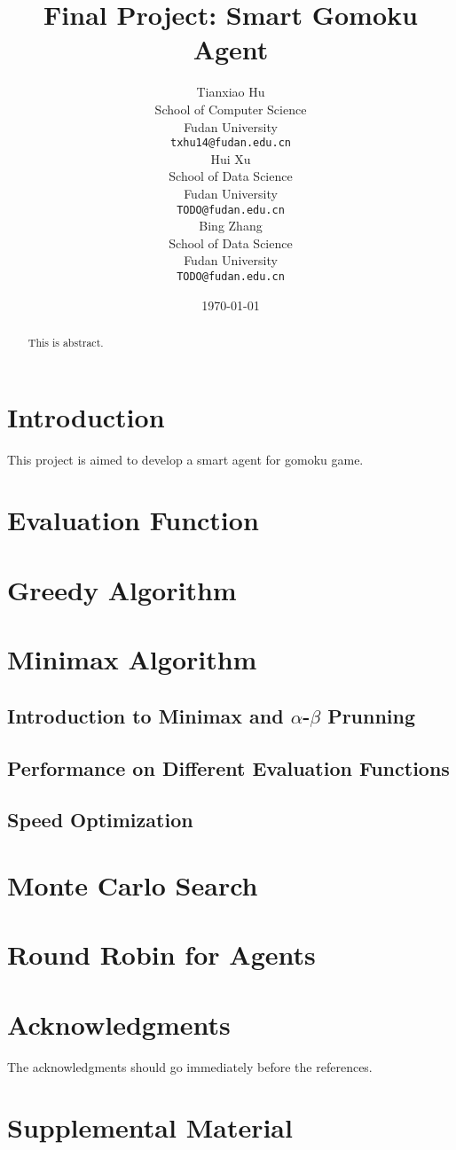 \documentclass[11pt,a4paper]{article}
\title{Final Project: Smart Gomoku Agent}
\author{Tianxiao Hu \\
  School of Computer Science\\
  Fudan University\\
  {\tt txhu14@fudan.edu.cn} \\\And
  Hui Xu \\
  School of Data Science\\
  Fudan University\\
  {\tt TODO@fudan.edu.cn} \\\And
  Bing Zhang \\
  School of Data Science\\
  Fudan University\\
  {\tt TODO@fudan.edu.cn}
}
\date{\today}
\begin{document}
\maketitle
\begin{abstract}
  This is abstract.
\end{abstract}

\section{Introduction}

This project is aimed to develop a smart agent for gomoku game.

\section{Evaluation Function}

\section{Greedy Algorithm}

\section{Minimax Algorithm}

\subsection{Introduction to Minimax and $\alpha$-$\beta$ Prunning}

\subsection{Performance on Different Evaluation Functions}

\subsection{Speed Optimization}

\section{Monte Carlo Search}

\section{Round Robin for Agents}

\section*{Acknowledgments}

The acknowledgments should go immediately before the references.




\appendix

\section{Supplemental Material}
\end{document}
